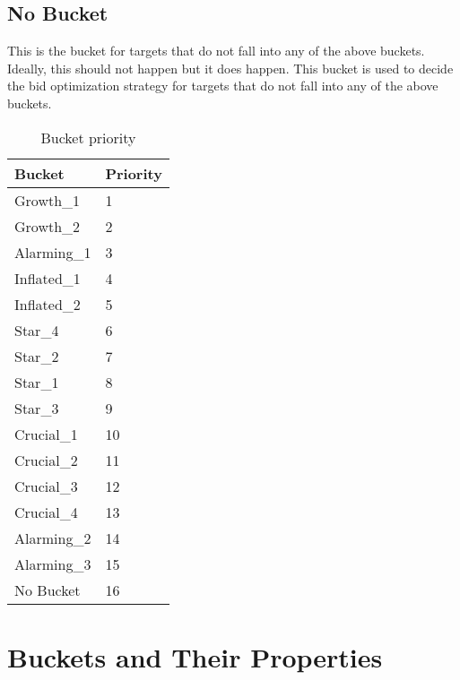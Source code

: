 \subsection{No Bucket}

This is the bucket for targets that do not fall into any of the above buckets. Ideally, this should not happen but it does happen. This bucket is used to decide the bid optimization strategy for targets that do not fall into any of the above buckets.


\begin{table}[ht]
    \centering
    \begin{tabular}{|l|l|}
        \hline
        \textbf{Bucket} & \textbf{Priority} \\ \hline
        Growth\_1       & 1                 \\ \hline
        Growth\_2       & 2                 \\ \hline
        Alarming\_1     & 3                 \\ \hline
        Inflated\_1     & 4                 \\ \hline
        Inflated\_2     & 5                 \\ \hline
        Star\_4         & 6                 \\ \hline
        Star\_2         & 7                 \\ \hline
        Star\_1         & 8                 \\ \hline
        Star\_3         & 9                 \\ \hline
        Crucial\_1      & 10                \\ \hline
        Crucial\_2      & 11                \\ \hline
        Crucial\_3      & 12                \\ \hline
        Crucial\_4      & 13                \\ \hline
        Alarming\_2     & 14                \\ \hline
        Alarming\_3     & 15                \\ \hline
        No Bucket       & 16                \\ \hline
    \end{tabular}
    \caption{Bucket priority}
    \label{tab:bucket_priority}
\end{table}

\section{Buckets and Their Properties}

